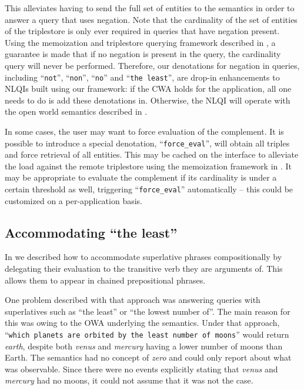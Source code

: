 \documentclass[../main.tex]{subfiles}
\begin{document}
\begin{refsection}
This alleviates having to send the full set of entities to the semantics in order to answer a query that uses negation. Note that the cardinality of the set of entities of the triplestore is only ever required in queries that have negation present.  Using the memoization and triplestore querying framework described in \cite{peelar2020webistjournal}, a guarantee is made that if no negation is present in the query, the cardinality query will never be performed.  Therefore, our denotations for negation in queries, including ``\texttt{not}'', ``\texttt{non}'', ``\texttt{no}'' and ``\texttt{the least}'', are drop-in enhancements to NLQIs built using our framework: if the CWA holds for the application, all one needs to do is add these denotations in.  Otherwise, the NLQI will operate with the open world semantics described in \cite{frostpeelar2019}.

In some cases, the user may want to force evaluation of the complement.  It is possible to introduce a special denotation, ``\texttt{force\_eval}'', will obtain all triples and force retrieval of all entities.  This may be cached on the interface to alleviate the load against the remote triplestore using the memoization framework in \cite{frostpeelar2019}.  It may be appropriate to evaluate the complement if its cardinality is under a certain threshold as well, triggering ``\texttt{force\_eval}'' automatically -- this could be customized on a per-application basis.

\subsection{Accommodating ``the least''} %

In \cite{frostpeelar2019} we described how to accommodate superlative phrases compositionally by
delegating their evaluation to the transitive verb they are arguments of.  This allows them to appear in chained prepositional phrases.

One problem described with that approach was answering queries with superlatives such as ``the least'' or ``the lowest number of''.  The main reason for this was owing to the OWA underlying the semantics.  Under that approach, ``\texttt{which planets are orbited by the least number of moons}'' would return \textit{earth}, despite both \textit{venus} and \textit{mercury} having a lower number of moons than Earth.  The semantics had no concept of \textit{zero} and could only report about what was observable.  Since there were no events explicitly stating that \textit{venus} and \textit{mercury} had no moons, it could not assume that it was not the case.


\end{refsection}
\end{document}
